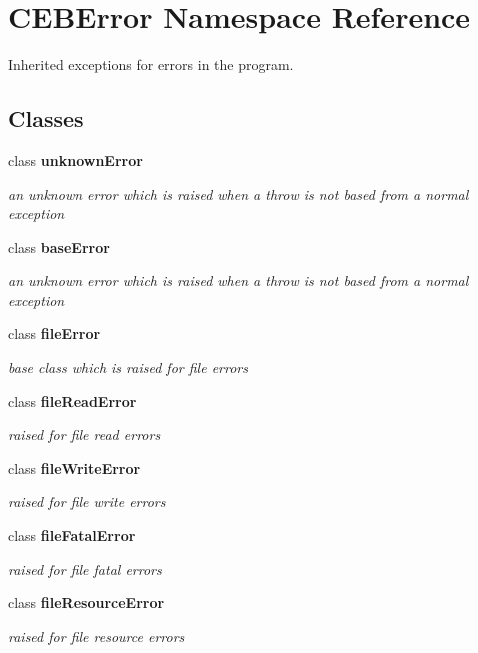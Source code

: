 \section{C\-E\-B\-Error Namespace Reference}
\label{namespace_c_e_b_error}


Inherited exceptions for errors in the program.  


\subsection*{Classes}
\begin{DoxyCompactItemize}
\item 
class {\bf unknown\-Error}
\begin{DoxyCompactList}\small\item\em an unknown error which is raised when a throw is not based from a normal exception \end{DoxyCompactList}\item 
class {\bf base\-Error}
\begin{DoxyCompactList}\small\item\em an unknown error which is raised when a throw is not based from a normal exception \end{DoxyCompactList}\item 
class {\bf file\-Error}
\begin{DoxyCompactList}\small\item\em base class which is raised for file errors \end{DoxyCompactList}\item 
class {\bf file\-Read\-Error}
\begin{DoxyCompactList}\small\item\em raised for file read errors \end{DoxyCompactList}\item 
class {\bf file\-Write\-Error}
\begin{DoxyCompactList}\small\item\em raised for file write errors \end{DoxyCompactList}\item 
class {\bf file\-Fatal\-Error}
\begin{DoxyCompactList}\small\item\em raised for file fatal errors \end{DoxyCompactList}\item 
class {\bf file\-Resource\-Error}
\begin{DoxyCompactList}\small\item\em raised for file resource errors \end{DoxyCompactList}\item 

\end{DoxyCompactItemize}
